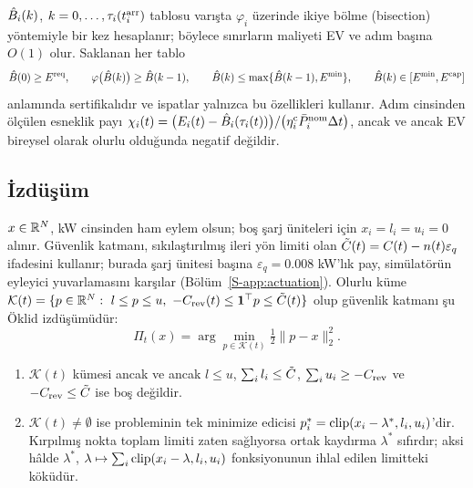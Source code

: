 $\hat B_i(k)$, $k=0,\dots,\tau_i(t_i^{\mathrm{arr}})$ tablosu varışta $\varphi_i$ üzerinde ikiye bölme (bisection) yöntemiyle bir kez hesaplanır; böylece sınırların maliyeti EV ve adım başına $O(1)$ olur.
Saklanan her tablo
\begin{equation}\label{eq:certified}
\hat B(0)\ge E^{\mathrm{req}},\qquad \varphi\big(\hat B(k)\big)\ge\hat B(k-1),\qquad \hat B(k)\le\max\{\hat B(k-1),E^{\min}\},\qquad \hat B(k)\in[E^{\min},E^{\mathrm{cap}}]
\end{equation}
anlamında sertifikalıdır ve ispatlar yalnızca bu özellikleri kullanır.
Adım cinsinden ölçülen esneklik payı $\chi_i(t)=\big(E_i(t)-\hat B_i(\tau_i(t))\big)/\big(\eta_i^{\mathrm c}\bar P^{\mathrm{nom}}_i\Delta t\big)$, ancak ve ancak EV bireysel olarak olurlu olduğunda negatif değildir.

\subsection{İzdüşüm}\label{sec:projection}

$x\in\mathbb R^N$, kW cinsinden ham eylem olsun; boş şarj üniteleri için $x_i=l_i=u_i=0$ alınır.
Güvenlik katmanı, sıkılaştırılmış ileri yön limiti olan $\tilde C(t)=C(t)-n(t)\varepsilon_q$ ifadesini kullanır; burada şarj ünitesi başına $\varepsilon_q=0.008$ kW'lık pay, simülatörün eyleyici yuvarlamasını karşılar (Bölüm~\ref{S-app:actuation}).
Olurlu küme $\mathcal K(t)=\{p\in\R^N:\ l\le p\le u,\ -\Crev(t)\le\mathbf 1^\top p\le\Ctil(t)\}$ olup güvenlik katmanı şu Öklid izdüşümüdür:
\begin{equation}\label{eq:proj}
\Pi_t(x)=\arg\min_{p\in\mathcal K(t)}\tfrac12\|p-x\|_2^2 .
\end{equation}

\begin{proposition}[İzdüşüm]\label{prop:projection}
\begin{enumerate}
\item[(i)] $\mathcal K(t)$ kümesi ancak ve ancak $l\le u$, $\sum_il_i\le\tilde C$, $\sum_iu_i\ge-C_{\mathrm{rev}}$ ve $-C_{\mathrm{rev}}\le\tilde C$ ise boş değildir.
\item[(ii)] $\mathcal K(t)\neq\emptyset$ ise  probleminin tek minimize edicisi $p_i^{*}=\operatorname{clip}(x_i-\lambda^{*},l_i,u_i)$'dir. Kırpılmış nokta toplam limiti zaten sağlıyorsa ortak kaydırma $\lambda^{*}$ sıfırdır; aksi hâlde $\lambda^{*}$, $\lambda\mapsto\sum_i\operatorname{clip}(x_i-\lambda,l_i,u_i)$ fonksiyonunun ihlal edilen limitteki köküdür.
\end{enumerate}
\end{proposition}

